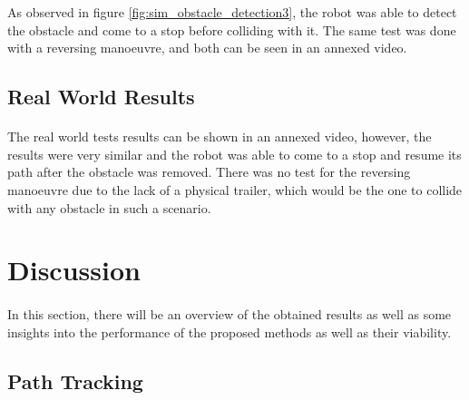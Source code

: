 As observed in figure \ref{fig:sim_obstacle_detection3}, the robot was able to 
detect the obstacle and come to a stop before colliding with it. The same test was 
done with a reversing manoeuvre, and both can be seen in an annexed video.
\subsection{Real World Results}
\paragraph{} The real world tests results can be shown in an annexed video, however, 
the results were very similar and the robot was able to come to a stop and resume its 
path after the obstacle was removed. There was no test for the reversing manoeuvre due to the 
lack of a physical trailer, which would be the one to collide with any obstacle in such a scenario.
\section{Discussion}
\label{sec:discussion}

\paragraph{}In this section, there will be an overview of the obtained results as well 
as some insights into the performance of the proposed methods as well as their viability.

\subsection{Path Tracking}
